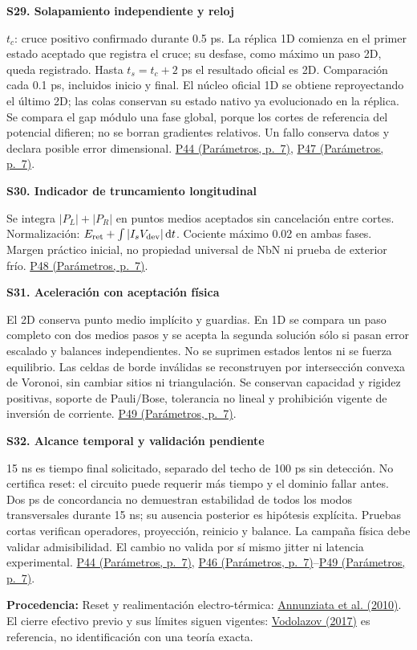 \documentclass[11pt,a4paper]{article}
\newcommand{\origin}[1]{\par{\footnotesize\raggedright\color{ink}\textbf{Procedencia:} #1\par}}
\newcommand{\pref}[2]{\href{Parametros.pdf\#nameddest=#1}{#1 (Parámetros, p.~#2)}}
\newcommand{\assumption}[2]{\par\vspace{6pt}\hypertarget{#1}{\textbf{\color{ink}#1. #2}}\par}
\newcommand{\smallnote}[1]{{\small #1\par}}
\begin{document}
\clearpage
\assumption{S29}{Solapamiento independiente y reloj}
\smallnote{\(t_c\): cruce positivo confirmado durante 0.5 ps.
La réplica 1D comienza en el primer estado aceptado que registra el cruce;
su desfase, como máximo un paso 2D, queda registrado.
Hasta \(t_s=t_c+2\) ps el resultado oficial es 2D.
Comparación cada 0.1 ps, incluidos inicio y final.
El núcleo oficial 1D se obtiene reproyectando el último 2D; las colas conservan su estado nativo ya evolucionado en la réplica. Se compara el gap módulo una fase global, porque los cortes de referencia del potencial difieren; no se borran gradientes relativos.
Un fallo conserva datos y declara posible error dimensional.
\pref{P44}{7}, \pref{P47}{7}.}
\assumption{S30}{Indicador de truncamiento longitudinal}
\smallnote{Se integra \(|P_L|+|P_R|\) en puntos medios aceptados sin
cancelación entre cortes. Normalización:
\(E_{\rm ret}+\int|I_sV_{\rm dev}|\,{\rm d}t\).
Cociente máximo 0.02 en ambas fases.
Margen práctico inicial, no propiedad universal de NbN ni prueba de exterior
frío. \pref{P48}{7}.}
\assumption{S31}{Aceleración con aceptación física}
\smallnote{El 2D conserva punto medio implícito y guardias. En 1D se compara
un paso completo con dos medios pasos y se acepta la segunda solución sólo
si pasan error escalado y balances independientes.
No se suprimen estados lentos ni se fuerza equilibrio.
Las celdas de borde inválidas se reconstruyen por intersección convexa de Voronoi, sin cambiar sitios ni triangulación. Se conservan capacidad y rigidez positivas, soporte de Pauli/Bose,
tolerancia no lineal y prohibición vigente de inversión de corriente.
\pref{P49}{7}.}
\assumption{S32}{Alcance temporal y validación pendiente}
\smallnote{15 ns es tiempo final solicitado, separado del techo de 100 ps
sin detección. No certifica reset: el circuito puede requerir más tiempo
y el dominio fallar antes. Dos ps de concordancia no demuestran estabilidad
de todos los modos transversales durante 15 ns; su ausencia posterior es
hipótesis explícita. Pruebas cortas verifican operadores, proyección, reinicio
y balance. La campaña física debe validar admisibilidad.
El cambio no valida por sí mismo jitter ni latencia experimental.
\pref{P44}{7}, \pref{P46}{7}--\pref{P49}{7}.}
\origin{Reset y realimentación electro-térmica:
\href{https://arxiv.org/abs/1008.0895}{Annunziata et al. (2010)}.
El cierre efectivo previo y sus límites siguen vigentes:
\href{https://arxiv.org/pdf/1611.06060}{Vodolazov (2017)}
es referencia, no identificación con una teoría exacta.}
\end{document}
